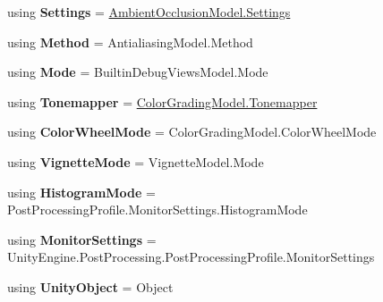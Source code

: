 \begin{DoxyCompactItemize}
\item 
\mbox{\label{namespace_unity_editor_1_1_post_processing_a03001cf2f893137ef8a9a57054900164}} 
using {\bfseries Settings} = \hyperlink{struct_unity_engine_1_1_post_processing_1_1_ambient_occlusion_model_1_1_settings}{Ambient\+Occlusion\+Model.\+Settings}
\item 
\mbox{\label{namespace_unity_editor_1_1_post_processing_a8c5d7ed72ff766fc95143da7fa5cb899}} 
using {\bfseries Method} = Antialiasing\+Model.\+Method
\item 
\mbox{\label{namespace_unity_editor_1_1_post_processing_a65c49c112e4eb37c811fa57a275231e9}} 
using {\bfseries Mode} = Builtin\+Debug\+Views\+Model.\+Mode
\item 
\mbox{\label{namespace_unity_editor_1_1_post_processing_ac4098a7d6a3538137148a2dd090eef8a}} 
using {\bfseries Tonemapper} = \hyperlink{class_unity_engine_1_1_post_processing_1_1_color_grading_model_a4955bb9dfed7e27c93e7493ff66f3de6}{Color\+Grading\+Model.\+Tonemapper}
\item 
\mbox{\label{namespace_unity_editor_1_1_post_processing_a63f4093c3b80718adbcf05d8ac53ba78}} 
using {\bfseries Color\+Wheel\+Mode} = Color\+Grading\+Model.\+Color\+Wheel\+Mode
\item 
\mbox{\label{namespace_unity_editor_1_1_post_processing_af7f8f737bc5127e50777057373b55b6b}} 
using {\bfseries Vignette\+Mode} = Vignette\+Model.\+Mode
\item 
\mbox{\label{namespace_unity_editor_1_1_post_processing_abf1f5783b507b47d86d7eca6d02358b3}} 
using {\bfseries Histogram\+Mode} = Post\+Processing\+Profile.\+Monitor\+Settings.\+Histogram\+Mode
\item 
\mbox{\label{namespace_unity_editor_1_1_post_processing_a1406720dd4f22de1ae4d53487f0701d9}} 
using {\bfseries Monitor\+Settings} = Unity\+Engine.\+Post\+Processing.\+Post\+Processing\+Profile.\+Monitor\+Settings
\item 
\mbox{\label{namespace_unity_editor_1_1_post_processing_ad423241489697fa1f651c396ddfe07b8}} 
using {\bfseries Unity\+Object} = Object
\end{DoxyCompactItemize}
